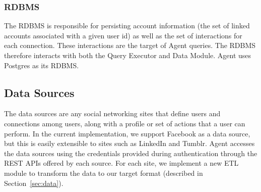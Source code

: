 \subsubsection{RDBMS}
The RDBMS is responsible for persisting account information (the set of linked
accounts associated with a given user id) as well as the set of interactions for
each connection. These interactions are the target of Agent queries. The RDBMS
therefore interacts with both the Query Executor and Data Module. Agent uses
Postgres as its RDBMS.

\subsection{Data Sources}
The data sources are any social networking sites that define users and
connections among users, along with a profile or set of actions that a user can
perform. In the current implementation, we support Facebook as a data source,
but this is easily extensible to sites such as LinkedIn and Tumblr. Agent
accesses the data sources using the credentials provided during authentication
through the REST APIs offered by each source. For each site, we implement a new
ETL module to transform the data to our target format (described in
Section~\ref{sec:data}).

